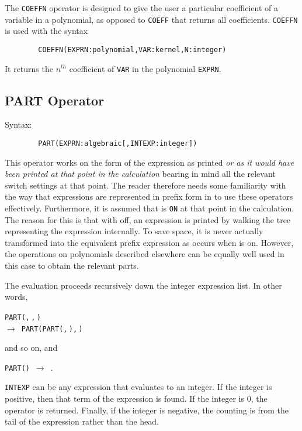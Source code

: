 The \texttt{COEFFN} operator is designed to give the user a particular
coefficient of a variable in a polynomial, as opposed to \texttt{COEFF} that
returns all coefficients. \texttt{COEFFN} is used with the syntax
\begin{verbatim}
        COEFFN(EXPRN:polynomial,VAR:kernel,N:integer)
\end{verbatim}
It returns the $n^{th}$ coefficient of \texttt{VAR} in the polynomial
\texttt{EXPRN}.

\subsection{PART Operator}
\hypertarget{operator:PART}{}
Syntax:
\begin{verbatim}
        PART(EXPRN:algebraic[,INTEXP:integer])
\end{verbatim}

This operator works on the form of the expression as printed \emph{or as it
would have been printed at that point in the calculation} bearing in mind
all the relevant switch settings at that point.  The reader therefore
needs some familiarity with the way that expressions are represented in
prefix form in {\REDUCE} to use these operators effectively.  Furthermore,
it is assumed that  is \texttt{ON} at that point in the calculation.
The reason for this is that with  off, an expression is printed
by walking the tree representing the expression internally.  To save
space, it is never actually transformed into the equivalent prefix
expression as occurs when  is on.  However, the operations on
polynomials described elsewhere can be equally well used in this case to
obtain the relevant parts.

The evaluation proceeds recursively down the integer expression list. In
other words,
\begin{syntaxtable}
  \texttt{PART(}\texttt{,}\,\texttt{,}\,\texttt{)} \\
  \qquad $\longrightarrow$\ \texttt{PART(PART(}\texttt{,}\,\texttt{),}\,\texttt{)}
\end{syntaxtable}
 and so on, and
\begin{syntax}
  \texttt{PART(}\texttt{)}\ $\longrightarrow$\ .
\end{syntax}
\texttt{INTEXP} can be any expression that evaluates to an integer.  If the
integer is positive, then that term of the expression is found.  If the
integer is 0, the operator is returned.  Finally, if the integer is
negative, the counting is from the tail of the expression rather than the
head.

